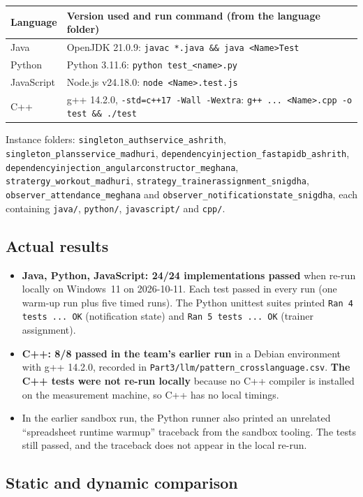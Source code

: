 \documentclass[11pt,a4paper]{article}
\newcommand{\fp}[1]{\nolinkurl{#1}}
\begin{document}
\begin{tabularx}{\linewidth}{@{}p{2.6cm}L@{}}
\toprule
Language & Version used and run command (from the language folder)\\
\midrule
Java & OpenJDK 21.0.9: \texttt{javac *.java \&\& java <Name>Test}\\
Python & Python 3.11.6: \texttt{python test\_<name>.py}\\
JavaScript & Node.js v24.18.0: \texttt{node <Name>.test.js}\\
C++ & g++ 14.2.0, \texttt{-std=c++17 -Wall -Wextra}: \texttt{g++ ... <Name>.cpp -o test \&\& ./test}\\
\bottomrule
\end{tabularx}

Instance folders: \fp{singleton_authservice_ashrith}, \fp{singleton_plansservice_madhuri}, \fp{dependencyinjection_fastapidb_ashrith}, \fp{dependencyinjection_angularconstructor_meghana}, \fp{stratergy_workout_madhuri}, \fp{strategy_trainerassignment_snigdha}, \fp{observer_attendance_meghana} and \fp{observer_notificationstate_snigdha}, each containing \texttt{java/}, \texttt{python/}, \texttt{javascript/} and \texttt{cpp/}.

\subsection{Actual results}

\begin{itemize}
\item \textbf{Java, Python, JavaScript: 24/24 implementations passed} when re-run locally on Windows~11 on 2026-10-11. Each test passed in every run (one warm-up run plus five timed runs). The Python unittest suites printed \texttt{Ran 4 tests ... OK} (notification state) and \texttt{Ran 5 tests ... OK} (trainer assignment).
\item \textbf{C++: 8/8 passed in the team's earlier run} in a Debian environment with g++ 14.2.0, recorded in \fp{Part3/llm/pattern_crosslanguage.csv}. \textbf{The C++ tests were not re-run locally} because no C++ compiler is installed on the measurement machine, so C++ has no local timings.
\item In the earlier sandbox run, the Python runner also printed an unrelated ``spreadsheet runtime warmup'' traceback from the sandbox tooling. The tests still passed, and the traceback does not appear in the local re-run.
\end{itemize}

\subsection{Static and dynamic comparison}
\end{document}
